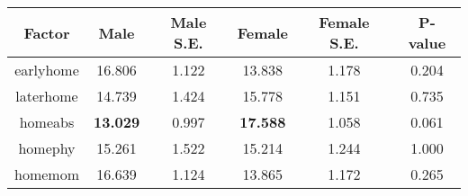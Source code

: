 \begin{longtable}{c c c c c c}
\toprule
\textbf{Factor} & \textbf{Male} & \textbf{Male S.E.}  & \textbf{Female} & \textbf{Female S.E.} & \textbf{P-value} \\
\midrule
earlyhome & 16.806 & 1.122 &  13.838 & 1.178 & 0.204 \\
laterhome & 14.739 & 1.424 &  15.778 & 1.151 & 0.735 \\
homeabs &  \textbf{13.029} & 0.997 &   \textbf{17.588} & 1.058 &0.061 \\
homephy & 15.261 & 1.522 &  15.214 & 1.244 & 1.000 \\
homemom & 16.639 & 1.124 &  13.865 & 1.172 & 0.265 \\
\bottomrule
\end{longtable}
